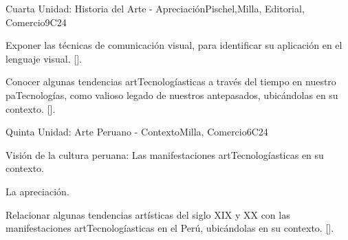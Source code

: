 \begin{syllabus}
\begin{unit}{}{Cuarta Unidad: Historia del Arte - Apreciación}{Pischel,Milla, Editorial, Comercio}{9}{C24}
\begin{learningoutcomes}
	\item Exponer las técnicas de comunicación visual, para identificar su aplicación en el lenguaje visual. [\Usage].
	\item Conocer algunas tendencias artTecnologíasticas a través del tiempo en nuestro paTecnologías, como valioso legado de nuestros antepasados, ubicándolas en su contexto. [\Usage].
\end{learningoutcomes}
\end{unit}

\begin{unit}{}{Quinta Unidad: Arte Peruano - Contexto}{Milla, Comercio}{6}{C24}
\begin{topics}
	\item Visión de la cultura peruana: Las manifestaciones artTecnologíasticas en su contexto.
	\item La apreciación.
\end{topics}
\begin{learningoutcomes}
	\item Relacionar  algunas tendencias artísticas del siglo XIX y XX con las manifestaciones artTecnologíasticas en el Perú, ubicándolas en su contexto. [\Usage].
\end{learningoutcomes}
\end{unit}



\begin{coursebibliography}
\end{coursebibliography}
\end{syllabus}
